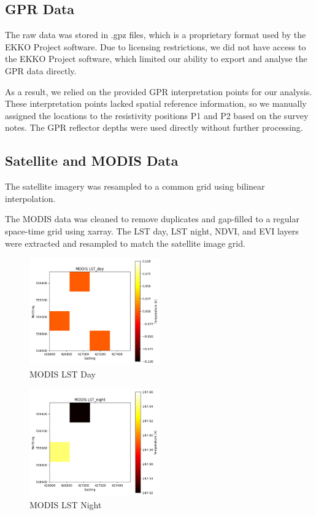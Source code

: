 \documentclass{article}
\begin{document}
\subsection{GPR Data}

The raw data was stored in .gpz files, which is a proprietary format used by the EKKO Project software. Due to licensing restrictions, we did not have access to the EKKO Project software, which limited our ability to export and analyse the GPR data directly.

As a result, we relied on the provided GPR interpretation points for our analysis. These interpretation points lacked spatial reference information, so we manually assigned the locations to the resistivity positions P1 and P2 based on the survey notes. The GPR reflector depths were used directly without further processing.

\subsection{Satellite and MODIS Data}

The satellite imagery was resampled to a common grid using bilinear interpolation.

The MODIS data was cleaned to remove duplicates and gap-filled to a regular space-time grid using xarray. The LST day, LST night, NDVI, and EVI layers were extracted and resampled to match the satellite image grid.

\begin{figure}[H]
	\centering
	\includegraphics[width=0.5\textwidth]{modis_lst_day.png}
	\caption{MODIS LST Day}
	\label{fig:modis_day}
\end{figure}

\begin{figure}[H]
	\centering
	\includegraphics[width=0.5\textwidth]{modis_lst_night.png}
	\caption{MODIS LST Night}
	\label{fig:modis_night}
\end{figure}
\end{document}
